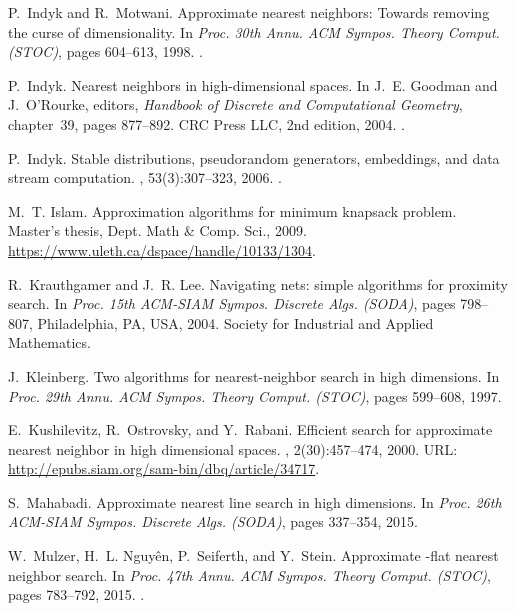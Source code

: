 \documentclass[12pt]{article}\usepackage[cm]{fullpage}
\theoremstyle{remark}\theoremheaderfont{\sf}\theorembodyfont{\upshape}\newtheorem{defn}[theorem]{Definition}
\numberwithin{figure}{section}\numberwithin{table}{section}\numberwithin{equation}{section}
\begin{document}
\begin{thebibliography}{CLMW11}
P.~Indyk and R.~Motwani.
\newblock Approximate nearest neighbors: {Towards} removing the curse of
  dimensionality.
\newblock In {\em Proc. 30th Annu. ACM Sympos. Theory Comput. {\em(STOC)}},
  pages 604--613, 1998.
\newblock \href {http://dx.doi.org/10.1145/276698.276876}
  {}.

P.~Indyk.
\newblock Nearest neighbors in high-dimensional spaces.
\newblock In J.~E. Goodman and J.~O'Rourke, editors, {\em Handbook of Discrete
  and Computational Geometry}, chapter~39, pages 877--892. CRC Press LLC, 2nd
  edition, 2004.
\newblock \href {http://dx.doi.org/10.1201/9781420035315.ch39}
  {}.

P.~Indyk.
\newblock Stable distributions, pseudorandom generators, embeddings, and data
  stream computation.
, 53(3):307--323, 2006.
\newblock \href {http://dx.doi.org/10.1145/1147954.1147955}
  {}.

M.~T. Islam.
\newblock Approximation algorithms for minimum knapsack problem.
\newblock Master's thesis, Dept. Math \& Comp. Sci., 2009.
\newblock \url{https://www.uleth.ca/dspace/handle/10133/1304}.

R.~Krauthgamer and J.~R. Lee.
\newblock Navigating nets: simple algorithms for proximity search.
\newblock In {\em Proc. 15th ACM-SIAM Sympos. Discrete Algs. {\em(SODA)}},
  pages 798--807, Philadelphia, PA, USA, 2004. Society for Industrial and
  Applied Mathematics.

J.~Kleinberg.
\newblock Two algorithms for nearest-neighbor search in high dimensions.
\newblock In {\em Proc. 29th Annu. ACM Sympos. Theory Comput. {\em(STOC)}},
  pages 599--608, 1997.

E.~Kushilevitz, R.~Ostrovsky, and Y.~Rabani.
\newblock Efficient search for approximate nearest neighbor in high dimensional
  spaces.
, 2(30):457--474, 2000.
\newblock URL: \url{http://epubs.siam.org/sam-bin/dbq/article/34717}.

S.~Mahabadi.
\newblock Approximate nearest line search in high dimensions.
\newblock In {\em Proc. 26th ACM-SIAM Sympos. Discrete Algs. {\em(SODA)}},
  pages 337--354, 2015.

W.~Mulzer, H.~L. Nguy{\^{e}}n, P.~Seiferth, and Y.~Stein.
\newblock Approximate -flat nearest neighbor search.
\newblock In {\em Proc. 47th Annu. ACM Sympos. Theory Comput. {\em(STOC)}},
  pages 783--792, 2015.
\newblock \href {http://dx.doi.org/10.1145/2746539.2746559}
  {}.


\end{thebibliography}
\end{document}
